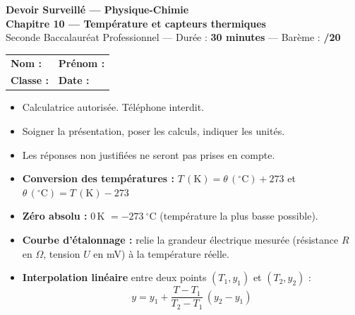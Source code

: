 \documentclass[a4paper,11pt]{article}
\begin{document}
\begin{center}
{\LARGE\bfseries\color{violet} Devoir Surveillé — Physique-Chimie}\\[4pt]
{\large\bfseries Chapitre 10 — Température et capteurs thermiques}\\[6pt]
{\normalsize Seconde Baccalauréat Professionnel — Durée : \textbf{30 minutes} — Barème : \textbf{/20}}
\end{center}

\vspace{2pt}
\noindent
\begin{tabular}{@{}p{}p{}@{}}
\textbf{Nom :} \dotfill & \textbf{Prénom :} \dotfill \\[6pt]
\textbf{Classe :} \dotfill & \textbf{Date :} \dotfill \\
\end{tabular}

\vspace{4pt}
\begin{consigne}
\begin{itemize}[leftmargin=*,itemsep=1pt,topsep=2pt]
  \item Calculatrice autorisée. Téléphone interdit.
  \item Soigner la présentation, poser les calculs, indiquer les unités.
  \item Les réponses non justifiées ne seront pas prises en compte.
\end{itemize}
\end{consigne}

\begin{rappel}
\begin{itemize}[leftmargin=*,itemsep=1pt,topsep=2pt]
  \item \textbf{Conversion des températures :} $T\,(\text{K}) = \theta\,(^\circ\text{C}) + 273$
        \quad et \quad $\theta\,(^\circ\text{C}) = T\,(\text{K}) - 273$
  \item \textbf{Zéro absolu :} $0$\,K $= -273\ ^\circ$C (température la plus basse possible).
  \item \textbf{Courbe d'étalonnage :} relie la grandeur électrique mesurée (résistance $R$ en $\Omega$, tension $U$ en mV) à la température réelle.
  \item \textbf{Interpolation linéaire} entre deux points $(T_1,y_1)$ et $(T_2,y_2)$ :
        \[ y = y_1 + \frac{T - T_1}{T_2 - T_1}\,(y_2 - y_1) \]
\end{itemize}
\end{rappel}
\end{document}
